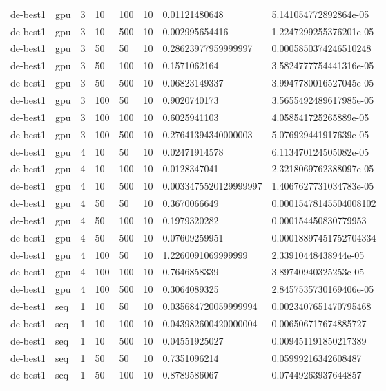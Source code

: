\begin{table}[t]
\begin{tabular}{llllllll}
de-best1 & gpu & 3 & 10 & 100 & 10 & 0.01121480648 & 5.141054772892864e-05 \\
de-best1 & gpu & 3 & 10 & 500 & 10 & 0.002995654416 & 1.2247299255376201e-05 \\
de-best1 & gpu & 3 & 50 & 50 & 10 & 0.28623977959999997 & 0.0005850374246510248 \\
de-best1 & gpu & 3 & 50 & 100 & 10 & 0.1571062164 & 3.5824777754441316e-05 \\
de-best1 & gpu & 3 & 50 & 500 & 10 & 0.06823149337 & 3.9947780016527045e-05 \\
de-best1 & gpu & 3 & 100 & 50 & 10 & 0.9020740173 & 3.5655492489617985e-05 \\
de-best1 & gpu & 3 & 100 & 100 & 10 & 0.6025941103 & 4.058541725265889e-05 \\
de-best1 & gpu & 3 & 100 & 500 & 10 & 0.27641394340000003 & 5.076929441917639e-05 \\
de-best1 & gpu & 4 & 10 & 50 & 10 & 0.02471914578 & 6.113470124505082e-05 \\
de-best1 & gpu & 4 & 10 & 100 & 10 & 0.0128347041 & 2.3218069762388097e-05 \\
de-best1 & gpu & 4 & 10 & 500 & 10 & 0.0033475520129999997 & 1.4067627731034783e-05 \\
de-best1 & gpu & 4 & 50 & 50 & 10 & 0.3670066649 & 0.00015478145504008102 \\
de-best1 & gpu & 4 & 50 & 100 & 10 & 0.1979320282 & 0.000154450830779953 \\
de-best1 & gpu & 4 & 50 & 500 & 10 & 0.07609259951 & 0.00018897451752704334 \\
de-best1 & gpu & 4 & 100 & 50 & 10 & 1.2260091069999999 & 2.33910448438944e-05 \\
de-best1 & gpu & 4 & 100 & 100 & 10 & 0.7646858339 & 3.89740940325253e-05 \\
de-best1 & gpu & 4 & 100 & 500 & 10 & 0.3064089325 & 2.8457535730169406e-05 \\
de-best1 & seq & 1 & 10 & 50 & 10 & 0.035684720059999994 & 0.0023407651470795468 \\
de-best1 & seq & 1 & 10 & 100 & 10 & 0.043982600420000004 & 0.006506717674885727 \\
de-best1 & seq & 1 & 10 & 500 & 10 & 0.04551925027 & 0.009451191850217389 \\
de-best1 & seq & 1 & 50 & 50 & 10 & 0.7351096214 & 0.05999216342608487 \\
de-best1 & seq & 1 & 50 & 100 & 10 & 0.8789586067 & 0.07449263937644857 \\

\end{tabular}
\end{table}
